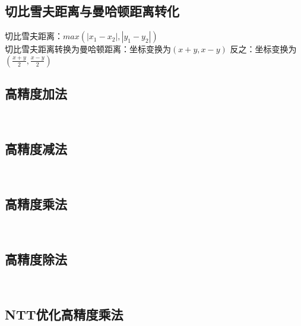 \documentclass[twocolumn,a4]{article}
\begin{document}
\subsection{切比雪夫距离与曼哈顿距离转化}
切比雪夫距离：$max(\left\lvert x_1-x_2 \right\rvert, \left\lvert y_1-y_2 \right\rvert)$
\\
切比雪夫距离转换为曼哈顿距离：坐标变换为$(x+y,x-y)$
反之：坐标变换为$(\frac{x+y}{2},\frac{x-y}{2})$

\subsection{高精度加法}
\begin{lstlisting}
    
\end{lstlisting}

\subsection{高精度减法}
\begin{lstlisting}
    
\end{lstlisting}

\subsection{高精度乘法}
\begin{lstlisting}
    
\end{lstlisting}

\subsection{高精度除法}
\begin{lstlisting}
    
\end{lstlisting}

\subsection{NTT优化高精度乘法}
\begin{lstlisting}
    
\end{lstlisting}
\end{document}
